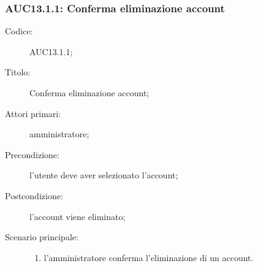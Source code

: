 \documentclass[../../../analisi-dei-requisiti.tex]{subfiles}
\begin{document}
\subsubsection{AUC13.1.1: Conferma eliminazione account}%
\label{subs:AUC13.1.1}
\begin{description}
  \item[Codice:] AUC13.1.1;
  \item[Titolo:] Conferma eliminazione account;
  \item[Attori primari:] amministratore;
  \item[Precondizione:] l'utente deve aver selezionato l'account;
  \item[Postcondizione:] l'account viene eliminato;
  \item[Scenario principale:]
  \begin{enumerate}
    \item l'amministratore conferma l'eliminazione di un account.
  \end{enumerate}
\end{description}
\end{document}
